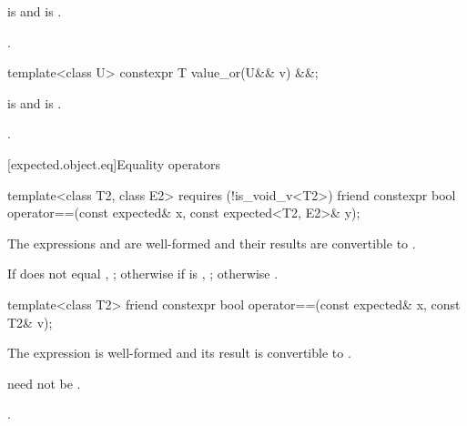 \begin{itemdescr}
\pnum
\mandates
{} is  and
 is .

\pnum
\returns
{}.
\end{itemdescr}

%
\begin{itemdecl}
template<class U> constexpr T value_or(U&& v) &&;
\end{itemdecl}

\begin{itemdescr}
\pnum
\mandates
{} is  and
 is .

\pnum
\returns
{}.
\end{itemdescr}

[expected.object.eq]{Equality operators}

%
\begin{itemdecl}
template<class T2, class E2> requires (!is_void_v<T2>)
  friend constexpr bool operator==(const expected& x, const expected<T2, E2>& y);
\end{itemdecl}

\begin{itemdescr}
\pnum
\mandates
The expressions  and 
are well-formed and their results are convertible to .

\pnum
\returns
If  does not equal , ;
otherwise if  is , ;
otherwise .
\end{itemdescr}

%
\begin{itemdecl}
template<class T2> friend constexpr bool operator==(const expected& x, const T2& v);
\end{itemdecl}

\begin{itemdescr}
\pnum
\mandates
The expression  is well-formed and
its result is convertible to .
\begin{note}
 need not be .
\end{note}

\pnum
\returns
{}.
\end{itemdescr}

